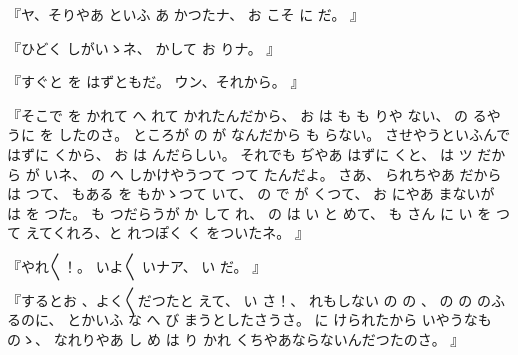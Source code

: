 『ヤ、そりやあ
といふ
あ
かつたナ、
お
こそ
に
だ。
』

『ひどく
しがいゝネ、
かして
お
りナ。
』

『すぐと
を
はずともだ。
ウン、それから。
』

『そこで
を
かれて
へ
れて
かれたんだから、
お
は
も
も
りや
ない、
の
るやうに
を
したのさ。
ところが
の
が
なんだから
も
らない。
させやうといふんで
はずに
くから、
お
は
んだらしい。
それでも
ぢやあ
はずに
くと、
は
ツ
だから
が
いネ、
の
へ
しかけやうつて
つて
たんだよ。
さあ、
られちやあ
だから
は
つて、
もある
を
もかゝつて
いて、
の
で
が
くつて、
お
にやあ
まないが
は
を
つた。
も
つだらうが
か
して
れ、
の
は
い
と
めて、
も
さん
に
い
を
つて
えてくれろ、と
れつぽく
く
をついたネ。
』

『やれ〳〵！。
いよ〳〵
いナア、
い
だ。
』

『するとお
、よく〳〵だつたと
えて、
い
さ！、
れもしない
の
の
、
の
の
のふるのに、
とかいふ
な
へ
び
まうとしたさうさ。
に
けられたから
いやうなものゝ、
なれりやあ
し
め
は
り
かれ
くちやあならないんだつたのさ。
』

